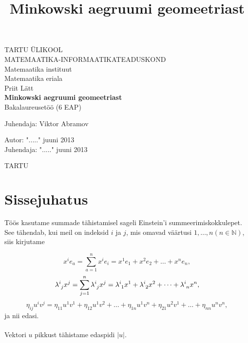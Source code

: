 \documentclass[a4paper,12pt]{article}
\title{Minkowski aegruumi geomeetriast}
\numberwithin{equation}{section}
\begin{document}
\begin{titlepage}
\begin{center}

{\large TARTU ÜLIKOOL}\\[0.3cm]
{\large MATEMAATIKA-INFORMAATIKATEADUSKOND}\\[0.3cm]
{\large Matemaatika instituut}\\[0.3cm]
{\large Matemaatika eriala}\\[3cm]

{\large Priit Lätt}\\[0.3cm]
{\huge \textbf{Minkowski aegruumi geomeetriast}}\\[0.3cm]
{\large Bakalaureusetöö (6 EAP)}\\[3cm]

\begin{flushright}
{\large Juhendaja: Viktor Abramov}
\end{flushright}

\vfill

\begin{flushleft}
{\large
Autor: \dotfill "....." juuni 2013\\
Juhendaja: \dotfill "....." juuni 2013\\[2cm]
}
\end{flushleft}
{\large TARTU \the\year}

\end{center}
\end{titlepage}

\tableofcontents
\newpage

\section{Sissejuhatus}
Töös kasutame summade tähistamisel sageli Einstein'i summeerimiskokkulepet. See tähendab, kui meil on indeksid $i$ ja $j$, mis omavad väärtusi $1, \dots, n \left( n \in \mathbb{N} \right)$, siis kirjutame 


\[ x^{i} e_{a} = \sum_{a=1}^{n} x^{i} e_{i} = x^{1} e_{1} + x^{2} e_{2} + \dots + x^{n} e_{n},\]
\[ \lambda\indices{^i_j} x^{j} = \sum_{j=1}^{n} \lambda\indices{^i_j} x^{j} = \lambda\indices{^i_1} x^{1} + \lambda\indices{^i_2} x^{2} + \dots +\lambda\indices{^i_n} x^{n}, \]
\[ \eta_{ij} u^{i} v^{j} = \eta_{11} u^{1} v^{1} + \eta_{12} u^{1} v^{2} + \dots + \eta_{1n} u^{1} v^{n} + \eta_{21} u^{2} v^{1} + \dots + \eta_{nn} u^{n} v^{n}, \]
ja nii edasi.

\paragraph{}
Vektori $u$ pikkust tähistame edaspidi $|u|$.
\newpage
\end{document}
